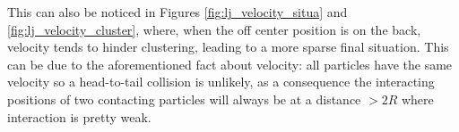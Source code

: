 \documentclass[../../master_thesis_np.tex]{subfiles}
\begin{document}
		This can also be noticed in Figures \ref{fig:lj_velocity_situa} and \ref{fig:lj_velocity_cluster}, where, when the off center position is on the back, velocity tends to hinder clustering, leading to a more sparse final situation. 
		This can be due to the aforementioned fact about velocity: all particles have the same velocity so a head-to-tail collision is unlikely, as a consequence the interacting positions of two contacting particles will always be at a distance $>2R$ where interaction is pretty weak. 
		
		\begin{figure}[htp]
			\centering\
			\\
			\\
			

\end{figure}
\end{document}
